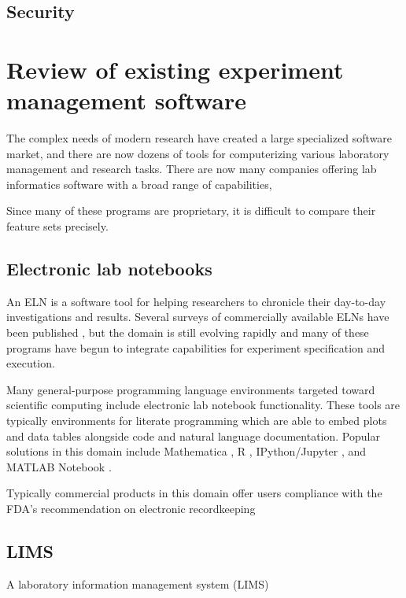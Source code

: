 \documentclass[../thesis]{subfiles}
\begin{document}
\subsection{Security}


\section{Review of existing experiment management \mbox{software}}

The complex needs of modern research have created a large specialized
software market, and there are now dozens of tools for computerizing
various laboratory management and research tasks. There are now many
companies offering lab informatics software with a broad range of
capabilities,

Since many of these programs are proprietary, it is difficult to
compare their feature sets precisely.



\subsection{Electronic lab notebooks}

An \gls{ELN} is a software tool for helping
researchers to chronicle their day-to-day investigations and
results. Several surveys of commercially available ELNs have been
published \cite{Rubacha2011, }, but the domain is still evolving
rapidly and many of these programs have begun to integrate
capabilities for experiment specification and execution.

Many general-purpose programming language environments targeted toward
scientific computing include electronic lab notebook functionality.
These tools are typically environments for literate programming
\cite{Knuth:1984:LP:473.479} which are able to embed plots and data
tables alongside code and natural language documentation. Popular
solutions in this domain include Mathematica \cite{mathematica},
R \cite{Rlang}, IPython/Jupyter \cite{IPython}, and
MATLAB Notebook \cite{MATLAB}.

Typically commercial products in this domain offer users compliance
with the FDA's recommendation on electronic recordkeeping \cite{FDA}



\subsection{\Gls{LIMS}}
A laboratory information management system (\gls{LIMS})
\end{document}
